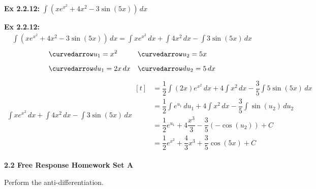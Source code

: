\begin{tcolorbox}[example]
    \textbf{Ex 2.2.12: } $\int \left(xe^{x^2} + 4x^2 - 3\sin (5x)\right) \, dx$
\end{tcolorbox}
\begin{tcolorbox}[solution]
    \textbf{Ex 2.2.12: } \begin{align*}
        \int \left(xe^{x^2} + 4x^2 - 3\sin (5x)\right) \, dx = \int xe^{x^2} \,dx + \int 4x^2 \, dx - \int 3\sin (5x) \,dx
    \end{align*} \vspace{-11pt} \begin{align*}
        &\curvedarrow u_1 = x^2 && \curvedarrow u_2 = 5x \\[5.5pt]
        &\curvedarrow du_1 = 2x \, dx && \curvedarrow du_2 = 5 \, dx
    \end{align*} \vspace{-11pt} \begin{align*}
        \int xe^{x^2} \, dx + \int 4x^2 \, dx - \int 3\sin (5x) \, dx \begin{aligned}[t]
            & = \dfrac{1}{2}\int (2x)e^{x^2} \, dx + 4\int x^2 \, dx - \dfrac{3}{5}\int 5\sin(5x) \, dx \\[11pt]
            & = \dfrac{1}{2}\int e^{u_1} \, du_1 + 4\int x^2 \, dx - \dfrac{3}{5}\int \sin \left(u_2\right) \, du_2 \\[11pt]
            & = \dfrac{1}{2}e^{u_1} + 4\dfrac{x^3}{3} - \dfrac{3}{5}(-\cos (u_2)) + C \\[11pt]
            & = \boxed{\dfrac{1}{2}e^{x^2} + \dfrac{4}{3}x^3 + \dfrac{3}{5}\cos (5x) + C}
        \end{aligned}
    \end{align*}
\end{tcolorbox} 

\newpage

\textbf{\large{2.2 Free Response Homework Set A}} \par

Perform the anti-differentiation. \par

 \\[11pt]
 \\[11pt]


